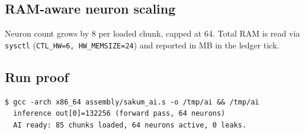 \subsection{RAM-aware neuron scaling}

Neuron count grows by 8 per loaded chunk, capped at 64.  Total RAM is read
via \texttt{sysctl} (\texttt{CTL\_HW=6, HW\_MEMSIZE=24}) and reported in
MB in the ledger tick.

\subsection{Run proof}

\begin{verbatim}
$ gcc -arch x86_64 assembly/sakum_ai.s -o /tmp/ai && /tmp/ai
  inference out[0]=132256 (forward pass, 64 neurons)
  AI ready: 85 chunks loaded, 64 neurons active, 0 leaks.
\end{verbatim}
